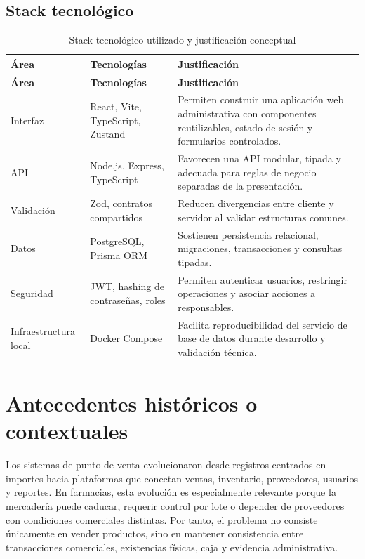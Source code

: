 \subsection{Stack tecnológico}

\begin{longtable}{p{}p{}p{}}
\caption{Stack tecnológico utilizado y justificación conceptual}\\
\toprule
\textbf{Área} & \textbf{Tecnologías} & \textbf{Justificación}\\
\midrule
\endfirsthead
\toprule
\textbf{Área} & \textbf{Tecnologías} & \textbf{Justificación}\\
\midrule
\endhead
Interfaz & React, Vite, TypeScript, Zustand & Permiten construir una aplicación web administrativa con componentes reutilizables, estado de sesión y formularios controlados.\\
API & Node.js, Express, TypeScript & Favorecen una API modular, tipada y adecuada para reglas de negocio separadas de la presentación.\\
Validación & Zod, contratos compartidos & Reducen divergencias entre cliente y servidor al validar estructuras comunes.\\
Datos & PostgreSQL, Prisma ORM & Sostienen persistencia relacional, migraciones, transacciones y consultas tipadas.\\
Seguridad & JWT, hashing de contraseñas, roles & Permiten autenticar usuarios, restringir operaciones y asociar acciones a responsables.\\
Infraestructura local & Docker Compose & Facilita reproducibilidad del servicio de base de datos durante desarrollo y validación técnica.\\
\bottomrule
\end{longtable}

\section{Antecedentes históricos o contextuales}

Los sistemas de punto de venta evolucionaron desde registros centrados en importes hacia plataformas que conectan ventas, inventario, proveedores, usuarios y reportes. En farmacias, esta evolución es especialmente relevante porque la mercadería puede caducar, requerir control por lote o depender de proveedores con condiciones comerciales distintas. Por tanto, el problema no consiste únicamente en vender productos, sino en mantener consistencia entre transacciones comerciales, existencias físicas, caja y evidencia administrativa.

